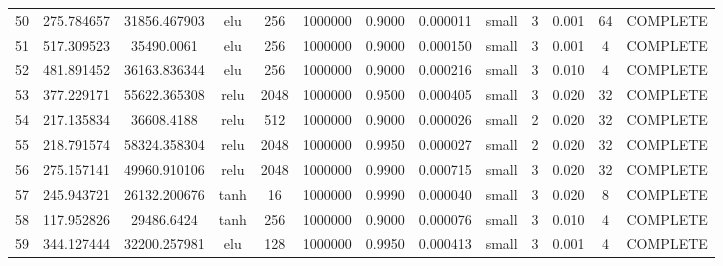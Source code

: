 \begin{longtable}{ccccccccccccc}
                       50 &                 275.784657 &                       31856.467903 &             elu &         256 &      1000000 & 0.9000 &       0.000011 &     small &             3 & 0.001 &          64 & COMPLETE \\
                       51 &                 517.309523 &                         35490.0061 &             elu &         256 &      1000000 & 0.9000 &       0.000150 &     small &             3 & 0.001 &           4 & COMPLETE \\
                       52 &                 481.891452 &                       36163.836344 &             elu &         256 &      1000000 & 0.9000 &       0.000216 &     small &             3 & 0.010 &           4 & COMPLETE \\
                       53 &                 377.229171 &                       55622.365308 &            relu &        2048 &      1000000 & 0.9500 &       0.000405 &     small &             3 & 0.020 &          32 & COMPLETE \\
                       54 &                 217.135834 &                         36608.4188 &            relu &         512 &      1000000 & 0.9000 &       0.000026 &     small &             2 & 0.020 &          32 & COMPLETE \\
                       55 &                 218.791574 &                       58324.358304 &            relu &        2048 &      1000000 & 0.9950 &       0.000027 &     small &             2 & 0.020 &          32 & COMPLETE \\
                       56 &                 275.157141 &                       49960.910106 &            relu &        2048 &      1000000 & 0.9900 &       0.000715 &     small &             3 & 0.020 &          32 & COMPLETE \\
                       57 &                 245.943721 &                       26132.200676 &            tanh &          16 &      1000000 & 0.9990 &       0.000040 &     small &             3 & 0.020 &           8 & COMPLETE \\
                       58 &                 117.952826 &                         29486.6424 &            tanh &         256 &      1000000 & 0.9000 &       0.000076 &     small &             3 & 0.010 &           4 & COMPLETE \\
                       59 &                 344.127444 &                       32200.257981 &             elu &         128 &      1000000 & 0.9950 &       0.000413 &     small &             3 & 0.001 &           4 & COMPLETE \\

\end{longtable}
